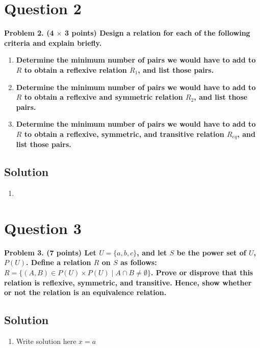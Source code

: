 \documentclass[11pt]{article}
\begin{document}
\clearpage
\section*{Question 2}

    \textbf{Problem 2. (4 $\times$ 3 points) Design a relation for each of the following criteria and explain briefly.}
    \begin{enumerate}[label=(\alph*)]
        \item \textbf{Determine the minimum number of pairs we would have to add to $R$ to obtain a reflexive relation $R_1$, and list those pairs.}
        \item \textbf{Determine the minimum number of pairs we would have to add to $R$ to obtain a reflexive and symmetric relation $R_2$, and list those pairs.}
        \item \textbf{Determine the minimum number of pairs we would have to add to $R$ to obtain a reflexive, symmetric, and transitive relation $R_{eq}$, and list those pairs.}
    \end{enumerate}

    \subsection*{Solution}
    \begin{enumerate}[label=(\alph*)]
        \item
    \end{enumerate}


\clearpage
\section*{Question 3}

    \textbf{Problem 3. (7 points) Let $U = \{a, b, c\}$, and let $S$ be the power set of $U$, $P(U)$. Define a relation $R$ on $S$ as follows: $R = \{ (A, B) \in P(U) \times P(U) \mid A \cap B \neq \emptyset \}$. Prove or disprove that this relation is reflexive, symmetric, and transitive. Hence, show whether or not the relation is an equivalence relation.}

    \subsection*{Solution}
    \begin{enumerate}[label=(\alph*)]
        \item Write solution here $x=a$
    \end{enumerate}
\end{document}
